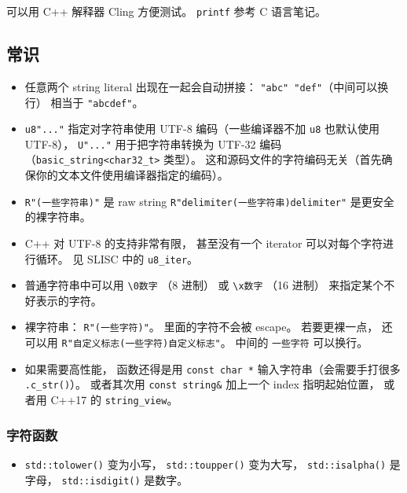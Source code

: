 
\begin{issues}
\issueDraft
\end{issues}

可以用 C++ 解释器 Cling 方便测试。 \verb|printf| 参考 C 语言笔记。

\subsection{常识}
\begin{itemize}
\item 任意两个 string literal 出现在一起会自动拼接： \verb`"abc" "def"`（中间可以换行） 相当于 \verb|"abcdef"|。
\item \verb|u8"..."| 指定对字符串使用 UTF-8 编码（一些编译器不加 \verb|u8| 也默认使用 UTF-8）， \verb|U"..."| 用于把字符串转换为 UTF-32 编码（\verb|basic_string<char32_t>| 类型）。 这和源码文件的字符编码无关（首先确保你的文本文件使用编译器指定的编码）。
\item \verb|R"(一些字符串)"| 是 raw string \verb|R"delimiter(一些字符串)delimiter"| 是更安全的裸字符串。
\item C++ 对 UTF-8 的支持非常有限， 甚至没有一个 iterator 可以对每个字符进行循环。 见 SLISC 中的 \verb|u8_iter|。
\item 普通字符串中可以用 \verb|\0数字| （8 进制） 或 \verb|\x数字| （16 进制） 来指定某个不好表示的字符。
\item 裸字符串： \verb|R"(一些字符)"|。 里面的字符不会被 escape。 若要更裸一点， 还可以用 \verb|R"自定义标志(一些字符)自定义标志"|。 中间的 \verb|一些字符| 可以换行。
\item 如果需要高性能， 函数还得是用 \verb|const char *| 输入字符串（会需要手打很多 \verb|.c_str()|）。 或者其次用 \verb|const string&| 加上一个 index 指明起始位置， 或者用 C++17 的 \verb|string_view|。
\end{itemize}

\subsubsection{字符函数}
\begin{itemize}
\item \verb|std::tolower()| 变为小写， \verb|std::toupper()| 变为大写， \verb|std::isalpha()| 是字母， \verb|std::isdigit()| 是数字。
\end{itemize}


